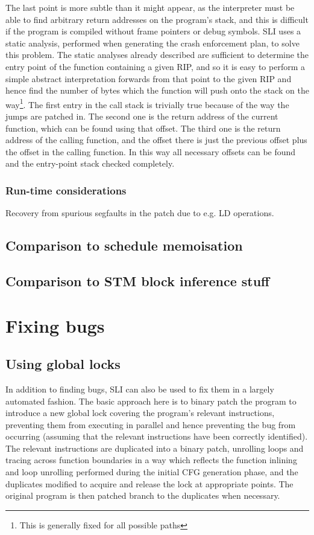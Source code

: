 The last point is more subtle than it might appear, as the interpreter must be able to find arbitrary return addresses on the program's stack, and this is difficult if the program is compiled without frame pointers or debug symbols.
SLI uses a static analysis, performed when generating the crash enforcement plan, to solve this problem.
The static analyses already described are sufficient to determine the entry point of the function containing a given RIP, and so it is easy to perform a simple abstract interpretation forwards from that point to the given RIP and hence find the number of bytes which the function will push onto the stack on the way\footnote{This is generally fixed for all possible paths}.
The first entry in the call stack is trivially true because of the way the jumps are patched in.
The second one is the return address of the current function, which can be found using that offset.
The third one is the return address of the calling function, and the offset there is just the previous offset plus the offset in the calling function.
In this way all necessary offsets can be found and the entry-point stack checked completely.

\subsubsection{Run-time considerations}

Recovery from spurious segfaults in the patch due to e.g. LD operations.

\subsection{Comparison to schedule memoisation}
\subsection{Comparison to STM block inference stuff}

\section{Fixing bugs}

\subsection{Using global locks}
\label{sect:fix_global_lock}

In addition to finding bugs, SLI can also be used to fix them in a
largely automated fashion.  The basic approach here is to binary patch
the program to introduce a new global lock covering the program's
relevant instructions, preventing them from executing in parallel and
hence preventing the bug from occurring (assuming that the relevant
instructions have been correctly identified).  The relevant
instructions are duplicated into a binary patch, unrolling loops and
tracing across function boundaries in a way which reflects the
function inlining and loop unrolling performed during the initial CFG
generation phase, and the duplicates modified to acquire and release
the lock at appropriate points.  The original program is then patched
branch to the duplicates when necessary.

